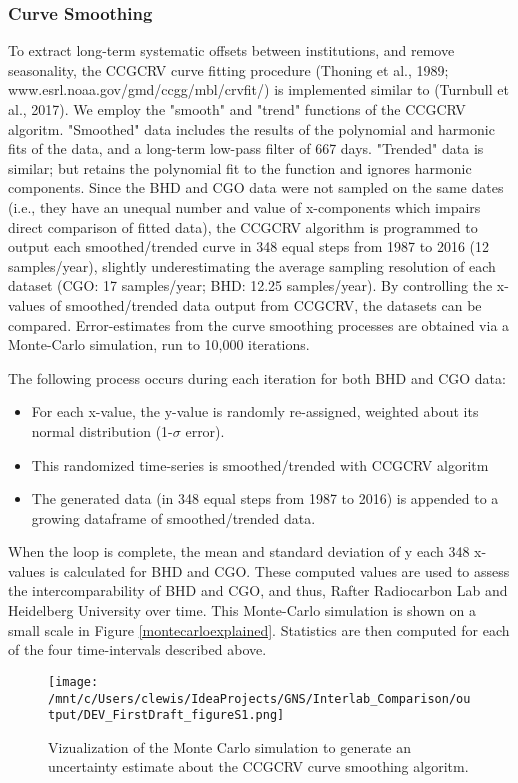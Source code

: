 \subsubsection{Curve Smoothing}
To extract long-term systematic offsets between institutions, and remove seasonality, the CCGCRV curve fitting procedure (Thoning et al., 1989; www.esrl.noaa.gov/gmd/ccgg/mbl/crvfit/) is implemented similar to (Turnbull et al., 2017). We employ the "smooth" and "trend" functions of the CCGCRV algoritm. "Smoothed" data includes the results of the polynomial and harmonic fits of the data, and a long-term low-pass filter of 667 days. "Trended" data is similar; but retains the polynomial fit to the function and ignores harmonic components. 
Since the BHD and CGO data were not sampled on the same dates (i.e., they have an unequal number and value of x-components which impairs direct comparison of fitted data), the CCGCRV algorithm is programmed to output each smoothed/trended curve in 348 equal steps from 1987 to 2016 (12 samples/year), slightly underestimating the average sampling resolution of each dataset (CGO: 17 samples/year; BHD: 12.25 samples/year). By controlling the x-values of smoothed/trended data output from CCGCRV, the datasets can be compared. 
Error-estimates from the curve smoothing processes are obtained via a Monte-Carlo simulation, run to 10,000 iterations. 

The following process occurs during each iteration for both BHD and CGO data: 
\begin{itemize}
	\item For each x-value, the y-value is  randomly re-assigned, weighted about its normal distribution (1-${\sigma}$ error). 
	\item This randomized time-series is smoothed/trended with CCGCRV algoritm 
	\item The generated data (in 348 equal steps from 1987 to 2016) is appended to a growing dataframe of smoothed/trended data.
\end{itemize}
When the loop is complete, the mean and standard deviation of y each 348 x-values is calculated for BHD and CGO. These computed values are used to assess the intercomparability of BHD and CGO, and thus, Rafter Radiocarbon Lab and Heidelberg University over time. This Monte-Carlo simulation is shown on a small scale in Figure \ref{montecarloexplained}. Statistics are then computed for each of the four time-intervals described above. 

\begin{figure}[h!]
  \texttt{[image: /mnt/c/Users/clewis/IdeaProjects/GNS/Interlab\_Comparison/output/DEV\_FirstDraft\_figureS1.png]}
  \caption{Vizualization of the Monte Carlo simulation to generate an uncertainty estimate about the CCGCRV curve smoothing algoritm. }
  \label{fig:montecarloexplained}
\end{figure}

